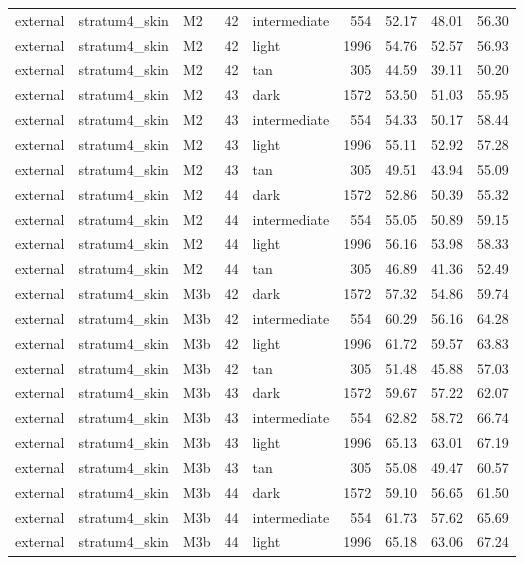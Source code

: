 \begin{tabular}{lllrlrrrr}
external & stratum4\_skin & M2 & 42 & intermediate & 554 & 52.17 & 48.01 & 56.30 \\
external & stratum4\_skin & M2 & 42 & light & 1996 & 54.76 & 52.57 & 56.93 \\
external & stratum4\_skin & M2 & 42 & tan & 305 & 44.59 & 39.11 & 50.20 \\
external & stratum4\_skin & M2 & 43 & dark & 1572 & 53.50 & 51.03 & 55.95 \\
external & stratum4\_skin & M2 & 43 & intermediate & 554 & 54.33 & 50.17 & 58.44 \\
external & stratum4\_skin & M2 & 43 & light & 1996 & 55.11 & 52.92 & 57.28 \\
external & stratum4\_skin & M2 & 43 & tan & 305 & 49.51 & 43.94 & 55.09 \\
external & stratum4\_skin & M2 & 44 & dark & 1572 & 52.86 & 50.39 & 55.32 \\
external & stratum4\_skin & M2 & 44 & intermediate & 554 & 55.05 & 50.89 & 59.15 \\
external & stratum4\_skin & M2 & 44 & light & 1996 & 56.16 & 53.98 & 58.33 \\
external & stratum4\_skin & M2 & 44 & tan & 305 & 46.89 & 41.36 & 52.49 \\
external & stratum4\_skin & M3b & 42 & dark & 1572 & 57.32 & 54.86 & 59.74 \\
external & stratum4\_skin & M3b & 42 & intermediate & 554 & 60.29 & 56.16 & 64.28 \\
external & stratum4\_skin & M3b & 42 & light & 1996 & 61.72 & 59.57 & 63.83 \\
external & stratum4\_skin & M3b & 42 & tan & 305 & 51.48 & 45.88 & 57.03 \\
external & stratum4\_skin & M3b & 43 & dark & 1572 & 59.67 & 57.22 & 62.07 \\
external & stratum4\_skin & M3b & 43 & intermediate & 554 & 62.82 & 58.72 & 66.74 \\
external & stratum4\_skin & M3b & 43 & light & 1996 & 65.13 & 63.01 & 67.19 \\
external & stratum4\_skin & M3b & 43 & tan & 305 & 55.08 & 49.47 & 60.57 \\
external & stratum4\_skin & M3b & 44 & dark & 1572 & 59.10 & 56.65 & 61.50 \\
external & stratum4\_skin & M3b & 44 & intermediate & 554 & 61.73 & 57.62 & 65.69 \\
external & stratum4\_skin & M3b & 44 & light & 1996 & 65.18 & 63.06 & 67.24 \\

\end{tabular}
